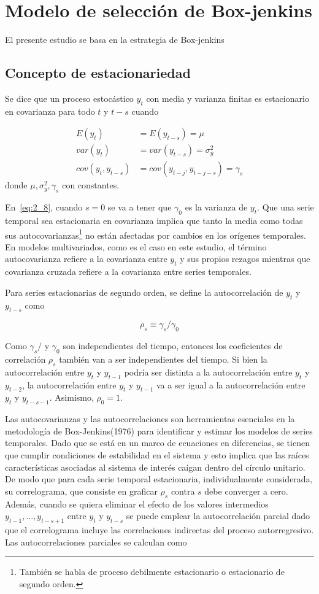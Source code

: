 \chapter{Modelo de selección de Box-jenkins}
El presente estudio se basa en la estrategia de Box-jenkins
\section{Concepto de estacionariedad}
Se dice que un proceso estocástico $y_t$ con media y varianza finitas es estacionario en covarianza para todo $t$ y $t-s$ cuando

\begin{align}
\label{eq:2_7}
E(y_t)&=E(y_{t-s})=\mu\\
\label{eq:2_8}
var(y_t)&=var(y_{t-s})=\sigma^2_y\\
\label{eq:2_9}
cov(y_t,y_{t-s})&=cov(y_{t-j},y_{t-j-s})=\gamma_s
\end{align}
donde $\mu, \sigma^2_y, \gamma_s$ con constantes.
   
En~\eqref{eq:2_8}, cuando $s=0$ se va a tener que $\gamma_0$ es la varianza de $y_t$. Que una serie temporal sea estacionaria en covarianza implica que tanto la media como todas sus autocovarianzas\footnote{También se habla de proceso debilmente estacionario o estacionario de segundo orden.} no están afectadas por cambios en los orígenes temporales. En modelos multivariados, como es el caso en este estudio, el término autocovarianza refiere a la covarianza entre $y_t$ y sus propios rezagos mientras que covarianza cruzada refiere a la covarianza entre series temporales.

Para series estacionarias de segundo orden, se define la autocorrelación de $y_t$ y $y_{t-s}$ como

\begin{equation*}
\rho_s\equiv\gamma_s/\gamma_0
\end{equation*} 

Como $\gamma_s/$ y $\gamma_0$ son independientes del tiempo, entonces los coeficientes de correlación $\rho_s$ también van a ser independientes del tiempo. Si bien la autocorrelación entre $y_t$ y $y_{t-1}$ podría ser distinta a la autocorrelación entre $y_t$ y $y_{t-2}$, la autocorrelación entre $y_t$ y $y_{t-1}$ va a ser igual a la autocorrelación entre $y_t$ y $y_{t-s-1}$. Asimismo, $\rho_0=1$.

Las autocovarianzas y las autocorrelaciones son herramientas esenciales en la metodología de Box-Jenkins(1976) para identificar y estimar los modelos de series temporales. Dado que se está en un marco de ecuaciones en diferencias, se tienen que cumplir condiciones de estabilidad en el sistema y esto implica que las raíces características asociadas al sistema de interés caígan dentro del círculo unitario. De modo que para cada serie temporal estacionaria, individualmente considerada, su correlograma, que consiste en graficar $\rho_s$ contra $s$ debe converger a cero.  Además, cuando se quiera eliminar el efecto de los valores intermedios $y_{t-1}, ..., y_{t-s+1}$  entre  $y_t$ y $y_{t-s}$ se puede emplear la autocorrelación parcial dado que el correlograma incluye las correlaciones indirectas del proceso autorregresivo. Las autocorrelaciones parciales se calculan como

